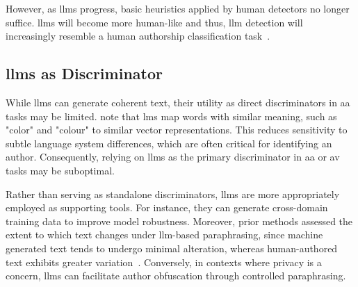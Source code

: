 However, as \acp{llm} progress, basic heuristics applied by human detectors no longer suffice.
\acp{llm} will become more human-like and thus, \ac{llm} detection will increasingly resemble a human authorship classification task~\citep{llm_detection_av_2025}.


\subsection{\acsp{llm} as Discriminator}
\label{sec:llm_discriminator}

While \acp{llm} can generate coherent text, their utility as direct discriminators in \ac{aa} tasks may be limited. 
\citet{altakrori_topic_2021} note that \acp{lm} map words with similar meaning, such as "color" and "colour" to similar vector representations.
This reduces sensitivity to subtle language system differences, which are often critical for identifying an author. 
Consequently, relying on \acp{llm} as the primary discriminator in \ac{aa} or \ac{av} tasks may be suboptimal.

Rather than serving as standalone discriminators, \acp{llm} are more appropriately employed as supporting tools. 
For instance, they can generate cross-domain training data to improve model robustness. 
Moreover, prior methods assessed the extent to which text changes under \ac{llm}-based paraphrasing, since machine generated text tends to undergo minimal alteration, whereas human-authored text exhibits greater variation~\citep{mao_raidar_2024}.
Conversely, in contexts where privacy is a concern, \acp{llm} can facilitate author obfuscation through controlled paraphrasing. 